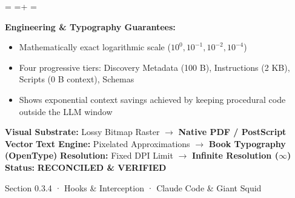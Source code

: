 \documentclass[10pt,a4paper,landscape]{article}
\newcommand{\pdautoscale}[2]{%
  \pdmaxh=#1\relax
  \pdmaxw=#2\relax
  \sbox{\pdscaledbox}{\usebox{\pdfigbox}}%
  \pdcurh=\dimexpr\ht\pdscaledbox+\dp\pdscaledbox\relax
  \pdcurw=\wd\pdscaledbox
  \ifdim\dimexpr\pdcurw * 100 / \pdmaxw\relax > \dimexpr\pdcurh * 100 / \pdmaxh\relax
    \resizebox{\pdmaxw}{!}{\usebox{\pdscaledbox}}%
  \else
    \resizebox{!}{\pdmaxh}{\usebox{\pdscaledbox}}%
  \fi
}
\begin{document}
\begin{minipage}[t]{0.492\linewidth}
  \begin{tcolorbox}[
    colback=pdcobalt!3,colframe=pdcobalt!85!black,arc=1.5pt,
    boxrule=0.7pt,top=1.5pt,bottom=1.5pt,left=4pt,right=4pt,
    title={\pdgrotesk\footnotesize\bfseries \color{white} B. Authoritative Native Vector Replacement \hfill \texttt{.tex / TikZ / PGF}}
  ]
    \begin{minipage}[c][8.3cm][c]{\linewidth}
      \centering
      \sbox{\pdfigbox}{}
      \pdautoscale{8.0cm}{\linewidth}
    \end{minipage}
    \tcblower
    \begin{minipage}[t][2.0cm][t]{\linewidth}
      \pdgrotesk\scriptsize
      \textbf{{\color{pdcobalt} Engineering \& Typography Guarantees:}}\\
      \begin{itemize}[leftmargin=9pt,itemsep=0pt,topsep=0.5pt,parsep=0pt]
        \item Mathematically exact logarithmic scale ($10^0, 10^{-1}, 10^{-2}, 10^{-4}$)
        \item Four progressive tiers: Discovery Metadata (100 B), Instructions (2 KB), Scripts (0 B context), Schemas
        \item Shows exponential context savings achieved by keeping procedural code outside the LLM window
      \end{itemize}
    \end{minipage}
  \end{tcolorbox}
\end{minipage}

\vspace*{0.05cm}
\noindent
\begin{tcolorbox}[
  colback=hhpaper,colframe=hhgray!35,arc=1.5pt,boxrule=0.4pt,
  top=1.5pt,bottom=1.5pt,left=6pt,right=6pt
]
  \pdgrotesk\scriptsize
  \noindent
  \textbf{Visual Substrate:} Lossy Bitmap Raster $\rightarrow$ \textbf{\color{pdcobalt}Native PDF / PostScript Vector}\hfill
  \textbf{Text Engine:} Pixelated Approximations $\rightarrow$ \textbf{\color{pdcobalt}Book Typography (OpenType)}\hfill
  \textbf{Resolution:} Fixed DPI Limit $\rightarrow$ \textbf{\color{pdcobalt}Infinite Resolution ($\infty$)}\hfill
  \textbf{Status:} \textbf{\color{pdteal}RECONCILED \& VERIFIED}
\end{tcolorbox}
\clearpage

\noindent
\begin{minipage}[t]{\linewidth}
  \hfill
  {\pdgrotesk\footnotesize\color{hhgray} Section 0.3.4 · Hooks \& Interception · Claude Code \& Giant Squid}\\
  \vspace*{0.03cm}
  \noindent{\color{hhgray!40}\rule{\linewidth}{0.5pt}}
\end{minipage}
\end{document}
